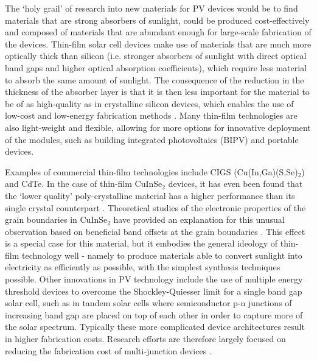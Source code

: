 \documentclass[11pt, twoside]{report}
\begin{document}
The `holy grail' of research into new materials for PV devices would be to find materials that are strong absorbers of sunlight, could be produced cost-effectively and composed of materials that are abundant enough for large-scale fabrication of the devices. 
Thin-film solar cell devices make use of materials that are much more optically thick than silicon (i.e. stronger absorbers of sunlight with direct optical band gaps and higher optical absorption coefficients), which require less material to absorb the same amount of sunlight. %
The consequence of the reduction in the thickness of the absorber layer is that it is then less important for the material to be of as high-quality as in crystalline silicon devices, which enables the use of low-cost and low-energy fabrication methods \cite{emerging_pv}. Many thin-film technologies are also light-weight and flexible, allowing for more options for innovative deployment of the modules, such as building integrated photovoltaics (BIPV) and portable devices.

Examples of commercial thin-film technologies include CIGS (Cu(In,Ga)(S,Se)$_2$) and CdTe. 
In the case of thin-film CuInSe$_2$ devices, it has even been found that the `lower quality' poly-crystalline material has a higher performance than its single crystal counterpart \cite{CIS1_3, CIS1_4}. Theoretical studies of the electronic properties of the grain boundaries in CuInSe$_2$ have provided an explanation for this unusual observation based on beneficial band offsets at the grain boundaries \cite{CIS1, CIS2}. This effect is a special case for this material, but it embodies the general ideology of thin-film technology well - namely to produce materials able to convert sunlight into electricity as efficiently as possible, with the simplest synthesis techniques possible.
Other innovations in PV technology include the use of multiple energy threshold devices to overcome the Shockley-Quiesser limit \cite{SQ_1961} for a single band gap solar cell, such as in tandem solar cells where semiconductor p-n junctions of increasing band gap are placed on top of each other in order to capture more of the solar spectrum. Typically these more complicated device architectures result in higher fabrication costs. Research efforts are therefore largely focused on reducing the fabrication cost of multi-junction devices \cite{3rd_gen}.
\end{document}
